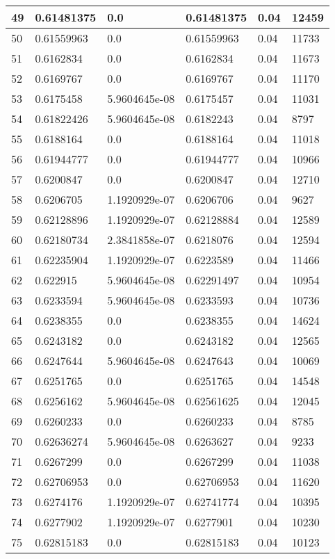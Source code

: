 \begin{longtable}{|l|l|l|l|l|l|}
49 & 0.61481375 & 0.0 & 0.61481375 & 0.04 & 12459 \\ \hline 
50 & 0.61559963 & 0.0 & 0.61559963 & 0.04 & 11733 \\ \hline 
51 & 0.6162834 & 0.0 & 0.6162834 & 0.04 & 11673 \\ \hline 
52 & 0.6169767 & 0.0 & 0.6169767 & 0.04 & 11170 \\ \hline 
53 & 0.6175458 & 5.9604645e-08 & 0.6175457 & 0.04 & 11031 \\ \hline 
54 & 0.61822426 & 5.9604645e-08 & 0.6182243 & 0.04 & 8797 \\ \hline 
55 & 0.6188164 & 0.0 & 0.6188164 & 0.04 & 11018 \\ \hline 
56 & 0.61944777 & 0.0 & 0.61944777 & 0.04 & 10966 \\ \hline 
57 & 0.6200847 & 0.0 & 0.6200847 & 0.04 & 12710 \\ \hline 
58 & 0.6206705 & 1.1920929e-07 & 0.6206706 & 0.04 & 9627 \\ \hline 
59 & 0.62128896 & 1.1920929e-07 & 0.62128884 & 0.04 & 12589 \\ \hline 
60 & 0.62180734 & 2.3841858e-07 & 0.6218076 & 0.04 & 12594 \\ \hline 
61 & 0.62235904 & 1.1920929e-07 & 0.6223589 & 0.04 & 11466 \\ \hline 
62 & 0.622915 & 5.9604645e-08 & 0.62291497 & 0.04 & 10954 \\ \hline 
63 & 0.6233594 & 5.9604645e-08 & 0.6233593 & 0.04 & 10736 \\ \hline 
64 & 0.6238355 & 0.0 & 0.6238355 & 0.04 & 14624 \\ \hline 
65 & 0.6243182 & 0.0 & 0.6243182 & 0.04 & 12565 \\ \hline 
66 & 0.6247644 & 5.9604645e-08 & 0.6247643 & 0.04 & 10069 \\ \hline 
67 & 0.6251765 & 0.0 & 0.6251765 & 0.04 & 14548 \\ \hline 
68 & 0.6256162 & 5.9604645e-08 & 0.62561625 & 0.04 & 12045 \\ \hline 
69 & 0.6260233 & 0.0 & 0.6260233 & 0.04 & 8785 \\ \hline 
70 & 0.62636274 & 5.9604645e-08 & 0.6263627 & 0.04 & 9233 \\ \hline 
71 & 0.6267299 & 0.0 & 0.6267299 & 0.04 & 11038 \\ \hline 
72 & 0.62706953 & 0.0 & 0.62706953 & 0.04 & 11620 \\ \hline 
73 & 0.6274176 & 1.1920929e-07 & 0.62741774 & 0.04 & 10395 \\ \hline 
74 & 0.6277902 & 1.1920929e-07 & 0.6277901 & 0.04 & 10230 \\ \hline 
75 & 0.62815183 & 0.0 & 0.62815183 & 0.04 & 10123 \\ \hline 
\end{longtable}